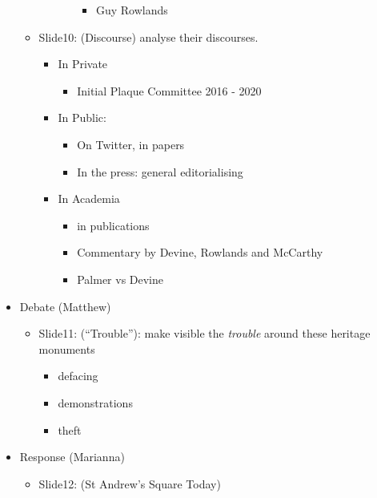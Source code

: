 \documentclass{scrartcl}
\begin{document}
\begin{itemize}
\begin{itemize}
\begin{itemize}
\begin{itemize}
                \begin{itemize}
                    \item Guy Rowlands
                \end{itemize}
            \end{itemize}
        \end{itemize}
        \item Slide10: (Discourse) analyse their discourses. 
        \begin{itemize}
            \item In Private
            \begin{itemize}
                \item Initial Plaque Committee 2016 - 2020
            \end{itemize}
            \item In Public:
            \begin{itemize}
                \item On Twitter, in papers
                \item In the press: general editorialising
            \end{itemize}
            \item In Academia
            \begin{itemize}
                \item in publications
                \item Commentary by Devine, Rowlands and McCarthy
                \item Palmer vs Devine
            \end{itemize}
        \end{itemize}
    \end{itemize}
    \item Debate (Matthew)
    \begin{itemize}
        \item Slide11: (``Trouble''): make visible the \textit{trouble} around these heritage monuments
        \begin{itemize}
            \item defacing
            \item demonstrations
            \item theft
        \end{itemize}
    \end{itemize}
    \item Response (Marianna)
    \begin{itemize}
        \item Slide12: (St Andrew's Square Today)

\end{itemize}
\end{itemize}
\end{document}
